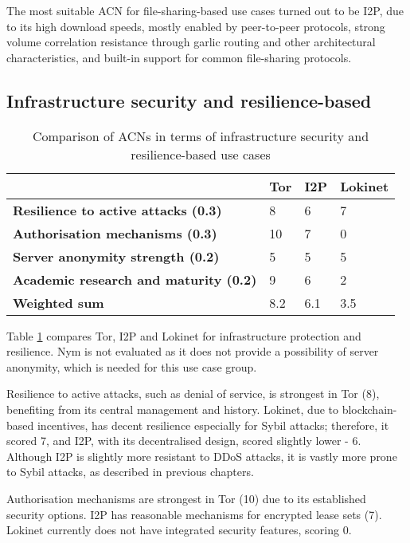 The most suitable ACN for file-sharing-based use cases turned out to be I2P, due to its high download speeds, mostly enabled by peer-to-peer protocols, strong volume correlation resistance through garlic routing and other architectural characteristics, and built-in support for common file-sharing protocols.

\subsection{Infrastructure security and resilience-based}

\begin{table}[!ht]
\caption{Comparison of ACNs in terms of infrastructure security and resilience-based use cases}
\label{tab:security_resilience_uc}
\small
\begin{tabular}{|p{}|p{}|p{}|p{}|}
\hline
\textbf{} & \textbf{Tor} & \textbf{I2P} & \textbf{Lokinet} \\
\hline
\textbf{Resilience to active attacks (0.3)} & 8 & 6 & 7 \\
\hline
\textbf{Authorisation mechanisms (0.3)} & 10 & 7 & 0 \\
\hline
\textbf{Server anonymity strength (0.2)} & 5 & 5 & 5 \\
\hline
\textbf{Academic research and maturity (0.2)} & 9 & 6 & 2 \\
\hline
\textbf{Weighted sum} & 8.2 & 6.1 & 3.5 \\
\hline
\end{tabular}
\end{table}

Table \ref{tab:security_resilience_uc} compares Tor, I2P and Lokinet for infrastructure protection and resilience. Nym is not evaluated as it does not provide a possibility of server anonymity, which is needed for this use case group.

Resilience to active attacks, such as denial of service, is strongest in Tor (8), benefiting from its central management and history. Lokinet, due to blockchain-based incentives, has decent resilience especially for Sybil attacks; therefore, it scored 7, and I2P, with its decentralised design, scored slightly lower - 6. Although I2P is slightly more resistant to DDoS attacks, it is vastly more prone to Sybil attacks, as described in previous chapters.

Authorisation mechanisms are strongest in Tor (10) due to its established security options. I2P has reasonable mechanisms for encrypted lease sets (7). Lokinet currently does not have integrated security features, scoring 0.

